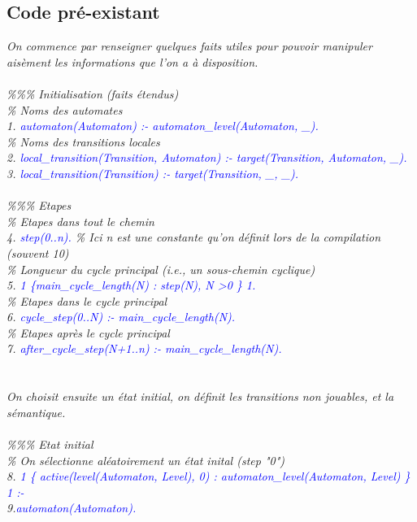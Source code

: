 \documentclass[12pt,a4paper]{article}
\begin{document}
\subsection{Code pré-existant}
\emph{
	On commence par renseigner quelques faits utiles pour pouvoir manipuler aisèment les informations que l'on a à disposition.\\ \\
	\%\%\% Initialisation (faits étendus)\\
	\% Noms des automates\\
	1. \textcolor{blue}{automaton(Automaton) :- automaton\_level(Automaton, \_).}\\
	\% Noms des transitions locales\\
	2. \textcolor{blue}{local\_transition(Transition, Automaton) :- target(Transition, Automaton, \_).}\\
	3. \textcolor{blue}{local\_transition(Transition) :- target(Transition, \_, \_).}\\ \\
	\%\%\% Etapes\\
	\% Etapes dans tout le chemin\\
	4. \textcolor{blue}{step(0..n).} \% Ici n est une constante qu'on définit lors de la compilation (souvent 10)\\
	\% Longueur du cycle principal (i.e., un sous-chemin cyclique)\\
	5. \textcolor{blue}{1 \{main\_cycle\_length(N) : step(N), N \textgreater 0 \} 1.}\\
	\% Etapes dans le cycle principal\\
	6. \textcolor{blue}{cycle\_step(0..N) :- main\_cycle\_length(N).}\\
	\% Etapes après le cycle principal\\
	7. \textcolor{blue}{after\_cycle\_step(N+1..n) :- main\_cycle\_length(N).}\\ \\ \\
	On choisit ensuite un état initial, on définit les transitions non jouables, et la sémantique.\\ \\
	\%\%\% Etat initial\\
	\% On sélectionne aléatoirement un état inital (step "0")\\
	8. \textcolor{blue}{1 \{ active(level(Automaton, Level), 0) : automaton\_level(Automaton, Level) \} 1 :-}\\
	9.\qquad\qquad\textcolor{blue}{automaton(Automaton).}\\ \\
}
\end{document}
